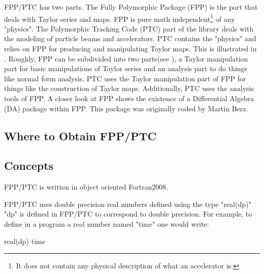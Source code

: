 \documentclass[english,12pt,article]{article} %
\begin{document}
FPP/PTC has two parts. The Fully Polymorphic Package (FPP) is the part that deals with Taylor series and maps. FPP is pure math independent\footnote{It does not contain any physical description of what an accelerator is. } of any "physics". The Polymorphic Tracking Code (PTC) part of the library deals with the modeling of particle beams and accelerators. PTC contains the "physics" and relies on FPP for producing and manipulating Taylor maps. This is illustrated in . Roughly, FPP can be subdivided into two parts(see ), a Taylor manipulation part for basic manipulations of Taylor series and an analysis part to do things like normal form analysis. PTC uses the Taylor manipulation part of FPP for things like the construction of Taylor maps. Additionally, PTC uses the analysis tools of FPP. A closer look at FPP shows the existence of a Differential Algebra (DA) package within FPP. This package was originally coded by Martin Berz.

\subsection{Where to Obtain FPP/PTC}

\subsection{Concepts}\label{s:concepts}

FPP/PTC is written in object oriented Fortran2008. 

FPP/PTC uses double precision real numbers defined using the type "real(dp)" "dp" is defined in FPP/PTC to correspond to double precision. For example, to define in a program a real number named "time" one would write:
\begin{example}
  real(dp) time
\end{example}
\end{document}

